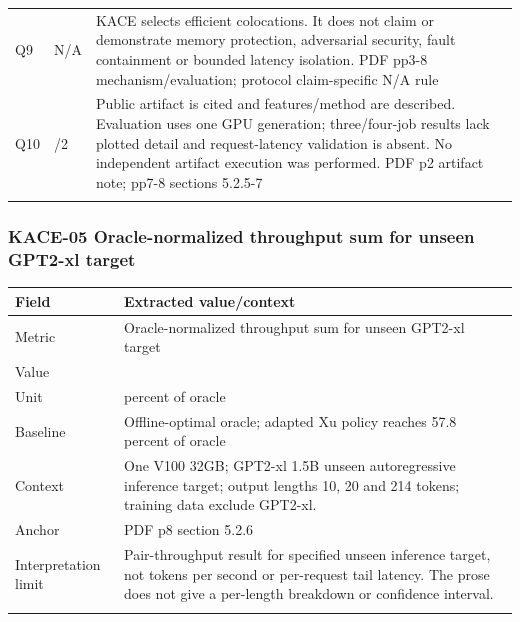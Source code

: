 \begin{longtable}{>{\raggedright\arraybackslash}p{}>{\raggedright\arraybackslash}p{}>{\raggedright\arraybackslash}p{}}
Q9 & N/A & KACE selects efficient colocations. It does not claim or demonstrate memory protection,\allowbreak{} adversarial security,\allowbreak{} fault containment or bounded latency isolation. PDF pp3-8 mechanism/evaluation;\allowbreak{} protocol claim-specific N/A rule\\\addlinespace
Q10 & 1/2 & Public artifact is cited and features/method are described. Evaluation uses one GPU generation;\allowbreak{} three/four-job results lack plotted detail and request-latency validation is absent. No independent artifact execution was performed. PDF p2 artifact note;\allowbreak{} pp7-8 sections 5.2.5-7\\\addlinespace
\bottomrule\end{longtable}
\subsubsection*{KACE-05 Oracle-normalized throughput sum for unseen GPT2-xl target}
\begin{longtable}{>{\raggedright\arraybackslash}p{}>{\raggedright\arraybackslash}p{}}
\toprule
\textbf{Field} & \textbf{Extracted value/context}\\\midrule\endhead
Metric & Oracle-normalized throughput sum for unseen GPT2-xl target\\\addlinespace
Value & 92.3\\\addlinespace
Unit & percent of oracle\\\addlinespace
Baseline & Offline-optimal oracle;\allowbreak{} adapted Xu policy reaches 57.8 percent of oracle\\\addlinespace
Context & One V100 32GB;\allowbreak{} GPT2-xl 1.5B unseen autoregressive inference target;\allowbreak{} output lengths 10,\allowbreak{} 20 and 214 tokens;\allowbreak{} training data exclude GPT2-xl.\\\addlinespace
Anchor & PDF p8 section 5.2.6\\\addlinespace
Interpretation limit & Pair-throughput result for specified unseen inference target,\allowbreak{} not tokens per second or per-request tail latency. The prose does not give a per-length breakdown or confidence interval.\\\addlinespace
\bottomrule\end{longtable}
